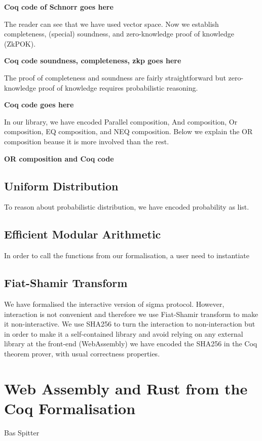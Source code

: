 \documentclass[sigconf]{acmart}
\begin{document}
  \textbf{Coq code of Schnorr goes here}
  

  The reader can see that we have used vector space. Now 
  we establish completeness, (special) soundness, and zero-knowledge 
  proof of knowledge (ZkPOK). 


  \textbf{Coq code soundness, completeness, zkp goes here}

  The proof of completeness and soundness are fairly straightforward but 
  zero-knowledge proof of knowledge requires probabilistic reasoning. 
  

  \textbf{Coq code goes here}
  

  In our library, we have encoded Parallel composition, 
  And composition, Or composition, EQ composition, and 
  NEQ composition. Below we explain the OR composition
  beause it is more involved than the rest. 
  
  \textbf{OR composition and Coq code}



  
  \subsection{Uniform Distribution}
  To reason about probabilistic distribution, 
  we have encoded probability as list. 

  \subsection{Efficient Modular Arithmetic}
  In order to call the functions from our formalisation, 
  a user need to instantiate 

  \subsection{Fiat-Shamir Transform}
 We have formalised the interactive version of sigma protocol. However,
 interaction is not convenient and therefore
 we use Fiat-Shamir transform to make it non-interactive. We use SHA256 
 to turn the interaction to non-interaction but in order to 
 make it a self-contained library and 
 avoid relying on any external library at the front-end (WebAssembly)
 we have encoded the SHA256 in the Coq theorem prover, with usual correctness 
 properties. 

 

\section{Web Assembly and Rust from the Coq Formalisation}
  Bas Spitter
\end{document}
